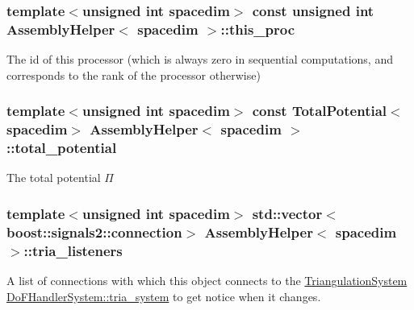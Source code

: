 \subsubsection[{\texorpdfstring{this\+\_\+proc}{this_proc}}]{\setlength{\rightskip}{0pt plus 5cm}template$<$unsigned int spacedim$>$ const unsigned int {\bf Assembly\+Helper}$<$ spacedim $>$\+::this\+\_\+proc\hspace{0.3cm}{\ttfamily [private]}}\hypertarget{class_assembly_helper_a2aad83ae1bfe5338794cf9b50848469a}{}\label{class_assembly_helper_a2aad83ae1bfe5338794cf9b50848469a}
The id of this processor (which is always zero in sequential computations, and corresponds to the rank of the processor otherwise) 
\subsubsection[{\texorpdfstring{total\+\_\+potential}{total_potential}}]{\setlength{\rightskip}{0pt plus 5cm}template$<$unsigned int spacedim$>$ const {\bf Total\+Potential}$<$spacedim$>$ {\bf Assembly\+Helper}$<$ spacedim $>$\+::total\+\_\+potential\hspace{0.3cm}{\ttfamily [private]}}\hypertarget{class_assembly_helper_a748eed9d73b7437a4bf2dcd73108790b}{}\label{class_assembly_helper_a748eed9d73b7437a4bf2dcd73108790b}
The total potential $\Pi$ 
\subsubsection[{\texorpdfstring{tria\+\_\+listeners}{tria_listeners}}]{\setlength{\rightskip}{0pt plus 5cm}template$<$unsigned int spacedim$>$ std\+::vector$<$boost\+::signals2\+::connection$>$ {\bf Assembly\+Helper}$<$ spacedim $>$\+::tria\+\_\+listeners\hspace{0.3cm}{\ttfamily [private]}}\hypertarget{class_assembly_helper_a228cec028ab5126d25c3ebf0e12a17a6}{}\label{class_assembly_helper_a228cec028ab5126d25c3ebf0e12a17a6}
A list of connections with which this object connects to the \hyperlink{class_triangulation_system}{Triangulation\+System} \hyperlink{class_do_f_handler_system_a06d93193cb47591db138cd8f41953796}{Do\+F\+Handler\+System\+::tria\+\_\+system} to get notice when it changes. 
